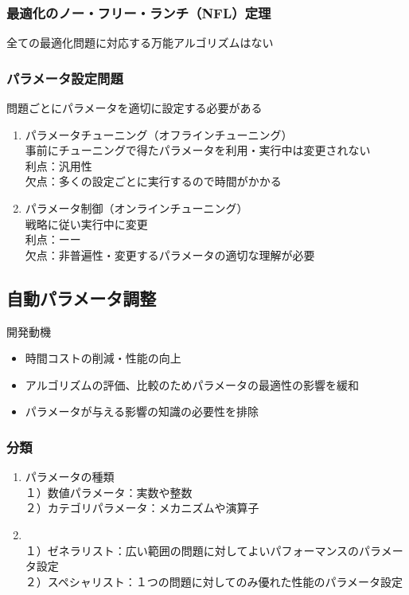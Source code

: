 \documentclass[twocolumn]{jarticle}     %
\begin{document}
\subsubsection{最適化のノー・フリー・ランチ（NFL）定理}
全ての最適化問題に対応する万能アルゴリズムはない

\subsubsection{パラメータ設定問題}
問題ごとにパラメータを適切に設定する必要がある

\begin{enumerate}
  \item パラメータチューニング（オフラインチューニング） \\
  事前にチューニングで得たパラメータを利用・実行中は変更されない\\
  利点：汎用性\\
  欠点：多くの設定ごとに実行するので時間がかかる

  \item パラメータ制御（オンラインチューニング） \\
  戦略に従い実行中に変更\\
  利点：ーー\\
  欠点：非普遍性・変更するパラメータの適切な理解が必要
\end{enumerate}


\subsection{自動パラメータ調整}

開発動機
\begin{itemize}
  \item 時間コストの削減・性能の向上
  \item アルゴリズムの評価、比較のためパラメータの最適性の影響を緩和
  \item パラメータが与える影響の知識の必要性を排除
\end{itemize}

\subsubsection{分類}

\begin{enumerate}
  \item パラメータの種類 \\
  １）数値パラメータ：実数や整数\\
  ２）カテゴリパラメータ：メカニズムや演算子

  \item  \\
  １）ゼネラリスト：広い範囲の問題に対してよいパフォーマンスのパラメータ設定\\
  ２）スペシャリスト：１つの問題に対してのみ優れた性能のパラメータ設定

\end{enumerate}
\end{document}
